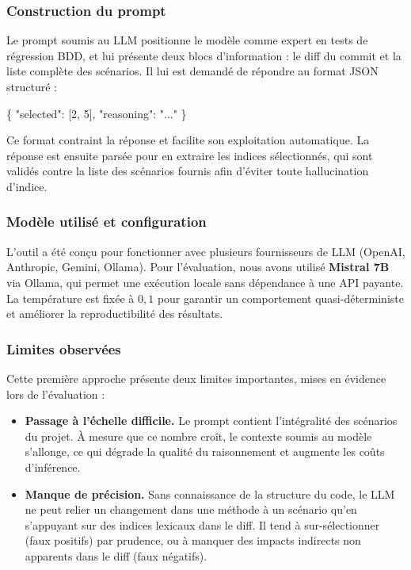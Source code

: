 \documentclass[12pt,a4paper]{article}
\begin{document}
\subsubsection{Construction du prompt}

Le prompt soumis au LLM positionne le modèle comme expert en tests de
régression BDD, et lui présente deux blocs d'information : le diff du
commit et la liste complète des scénarios. Il lui est demandé de répondre
au format JSON structuré :

\begin{center}
\ttfamily\small
\{ "selected": [2, 5], "reasoning": "..." \}
\end{center}

Ce format contraint la réponse et facilite son exploitation automatique.
La réponse est ensuite parsée pour en extraire les indices sélectionnés,
qui sont validés contre la liste des scénarios fournis afin d'éviter
toute hallucination d'indice.

\subsubsection{Modèle utilisé et configuration}

L'outil a été conçu pour fonctionner avec plusieurs fournisseurs de LLM
(OpenAI, Anthropic, Gemini, Ollama). Pour l'évaluation, nous avons
utilisé \textbf{Mistral 7B} via Ollama, qui permet une exécution locale
sans dépendance à une API payante. La température est fixée à $0{,}1$
pour garantir un comportement quasi-déterministe et améliorer la
reproductibilité des résultats.

\subsubsection{Limites observées}

Cette première approche présente deux limites importantes, mises en
évidence lors de l'évaluation :

\begin{itemize}
  \item \textbf{Passage à l'échelle difficile.} Le prompt contient
        l'intégralité des scénarios du projet. À mesure que ce nombre
        croît, le contexte soumis au modèle s'allonge, ce qui dégrade
        la qualité du raisonnement et augmente les coûts d'inférence.

  \item \textbf{Manque de précision.} Sans connaissance de la structure
        du code, le LLM ne peut relier un changement dans une méthode
        à un scénario qu'en s'appuyant sur des indices lexicaux dans le
        diff. Il tend à sur-sélectionner (faux positifs) par prudence,
        ou à manquer des impacts indirects non apparents dans le diff
        (faux négatifs).
\end{itemize}
\end{document}
